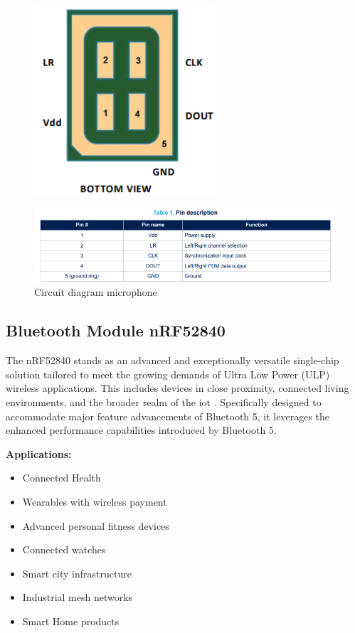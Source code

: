 \begin{figure}[h!]
	\centering
	\includegraphics[width=0.6\textwidth]{Images/hardware/bottom-view}
	\caption{} \label{fig:Bottom view}
\end{figure}

\begin{figure}[h!]
	\centering
	\includegraphics[width=1.3\textwidth]{Images/hardware/pin-description}
	\caption{Circuit diagram microphone} \label{fig:Pin description}
\end{figure}\cite{MP34DT06J:2021}

\subsection{Bluetooth Module nRF52840}

The nRF52840 stands as an advanced and exceptionally versatile single-chip solution tailored to meet the growing demands of Ultra Low Power (ULP) wireless applications. This includes devices in close proximity, connected living environments, and the broader realm of the \ac{iot} \cite{Arduino:2023}. Specifically designed to accommodate major feature advancements of Bluetooth 5, it leverages the enhanced performance capabilities introduced by Bluetooth 5.

\textbf{ Applications:}
 
 \begin{itemize}
 	\item Connected Health
 	\item Wearables with wireless payment
 	\item Advanced personal fitness devices
 	\item Connected watches
 	\item Smart city infrastructure
 	\item Industrial mesh networks
 	\item Smart Home products 	
 \end{itemize}
 
